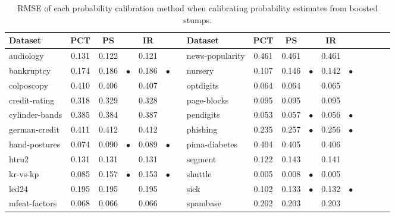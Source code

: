 \documentclass[wcp]{jmlr}
\begin{document}
\begin{table}[t]
\caption{\label{tab:boosted_stumps}RMSE of each probability calibration method when calibrating probability estimates from boosted stumps.}
\footnotesize
{\centering \begin{tabular}{lcc@{\hspace{0.1cm}}cc@{\hspace{0.1cm}}cclcc@{\hspace{0.1cm}}cc@{\hspace{0.1cm}}cc@{\hspace{0.1cm}}cr@{\hspace{0.1cm}}c}

\toprule
Dataset 			& PCT  & PS  &         & IR  & 			  & & Dataset 			& PCT  & PS  &         & IR  & 		 \\
\midrule
audiology       & 0.131 & 0.122 &           & 0.121 &           & & news-popularity & 0.461 & 0.461 &           & 0.461 &          \\
bankruptcy      & 0.174 & 0.186 & $\bullet$ & 0.186 & $\bullet$ & & nursery         & 0.107 & 0.146 & $\bullet$ & 0.142 & $\bullet$\\
colposcopy      & 0.410 & 0.406 &           & 0.407 &           & & optdigits       & 0.064 & 0.064 &           & 0.065 &          \\
credit-rating   & 0.318 & 0.329 &           & 0.328 &           & & page-blocks     & 0.095 & 0.095 &           & 0.095 &          \\
cylinder-bands  & 0.385 & 0.384 &           & 0.387 &           & & pendigits       & 0.053 & 0.057 & $\bullet$ & 0.056 & $\bullet$\\
german-credit   & 0.411 & 0.412 &           & 0.412 &           & & phishing        & 0.235 & 0.257 & $\bullet$ & 0.256 & $\bullet$\\
hand-postures   & 0.074 & 0.090 & $\bullet$ & 0.089 & $\bullet$ & & pima-diabetes   & 0.404 & 0.405 &           & 0.406 &          \\
htru2           & 0.131 & 0.131 &           & 0.131 &           & & segment         & 0.122 & 0.143 &           & 0.141 &          \\
kr-vs-kp        & 0.085 & 0.157 & $\bullet$ & 0.153 & $\bullet$ & & shuttle         & 0.005 & 0.008 & $\bullet$ & 0.005 &          \\
led24           & 0.195 & 0.195 &           & 0.195 &           & & sick            & 0.102 & 0.133 & $\bullet$ & 0.132 & $\bullet$\\
mfeat-factors   & 0.068 & 0.066 &           & 0.066 &           & & spambase        & 0.202 & 0.203 &           & 0.203 &          \\

\end{tabular}}
\end{table}
\end{document}
